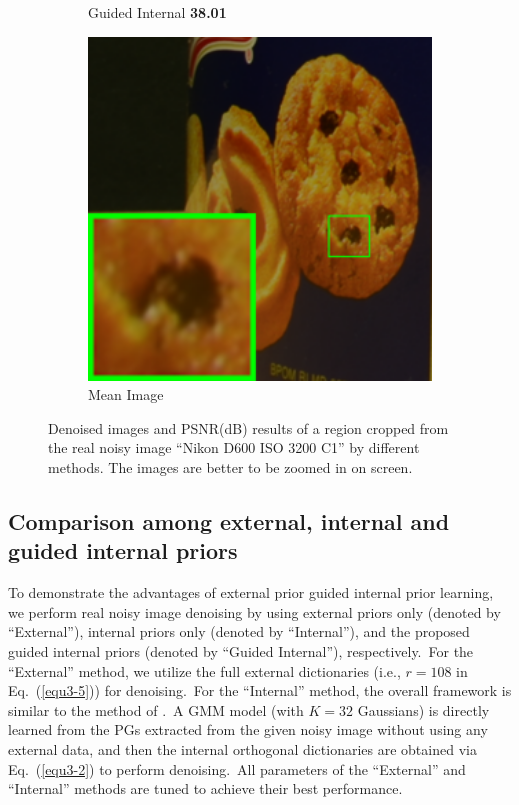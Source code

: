 \begin{figure}
\begin{subfigure}[t]{0.19\textwidth}
\caption{ Guided Internal \textbf{38.01}}
    \end{subfigure}
    \hfill
    \begin{subfigure}[t]{0.19\textwidth}
        \centering
        \includegraphics[width=1\textwidth]{images/guided/resize_br_Mean_CC_Noisy_Nikon_D600_ISO_3200_C1_94b.png}
\caption{Mean Image}
    \end{subfigure}
    \caption{Denoised images and PSNR(dB) results of a region cropped from the real noisy image ``Nikon D600 ISO 3200 C1'' \cite{crosschannel2016} by different methods. The images are better to be zoomed in on screen.}
    \label{fig3-8}
\end{figure}


\subsection{Comparison among external, internal and guided internal priors}

To demonstrate the advantages of external prior guided internal prior learning, we perform real noisy image denoising by using external priors only (denoted by ``External''), internal priors only (denoted by ``Internal''), and the proposed guided internal priors (denoted by ``Guided Internal''), respectively.\ For the ``External'' method, we utilize the full external dictionaries (i.e., $r=108$ in Eq.\ (\ref{equ3-5})) for denoising.\ For the ``Internal'' method, the overall framework is similar to the method of \cite{ncsr}.\ A GMM model (with $K = 32$ Gaussians) is directly learned from the PGs extracted from the given noisy image without using any external data, and then the internal orthogonal dictionaries are obtained via Eq.\ (\ref{equ3-2}) to perform denoising.\ All parameters of the ``External'' and ``Internal'' methods are tuned to achieve their best performance. 


